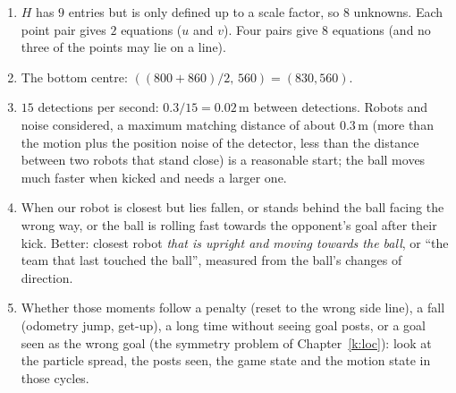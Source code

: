 \begin{enumerate}[label=\textbf{\ansnum.\arabic*}]
  \item $H$ has $9$ entries but is only defined up to a scale factor, so $8$ unknowns. Each point pair gives $2$ equations ($u$ and $v$). Four pairs give $8$ equations (and no three of the points may lie on a line).
  \item The bottom centre: $((800+860)/2,\,560)=(830,560)$.
  \item $15$ detections per second: $0.3/15=0.02$\,m between detections. Robots and noise considered, a maximum matching distance of about $0.3$\,m (more than the motion plus the position noise of the detector, less than the distance between two robots that stand close) is a reasonable start; the ball moves much faster when kicked and needs a larger one.
  \item When our robot is closest but lies fallen, or stands behind the ball facing the wrong way, or the ball is rolling fast towards the opponent's goal after their kick. Better: closest robot \emph{that is upright and moving towards the ball}, or ``the team that last touched the ball'', measured from the ball's changes of direction.
  \item Whether those moments follow a penalty (reset to the wrong side line), a fall (odometry jump, get-up), a long time without seeing goal posts, or a goal seen as the wrong goal (the symmetry problem of Chapter~\ref{k:loc}): look at the particle spread, the posts seen, the game state and the motion state in those cycles.
\end{enumerate}
